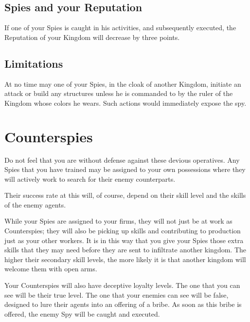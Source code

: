\subsection{Spies and your Reputation}

If one of your Spies is caught in his activities, and subsequently executed, the Reputation of your Kingdom will decrease by three points.

\subsection{Limitations}

At no time may one of your Spies, in the cloak of another Kingdom, initiate an attack or build any structures unless he is commanded to by the ruler of the Kingdom whose colors he wears. Such actions would immediately expose the spy.

\section{Counterspies}

Do not feel that you are without defense against these devious operatives. Any Spies that you have trained may be assigned to your own possessions where they will actively work to search for their enemy counterparts.

Their success rate at this will, of course, depend on their skill level and the skills of the enemy agents.

While your Spies are assigned to your firms, they will not just be at work as Counterspies; they will also be picking up skills and contributing to production just as your other workers. It is in this way that you give your Spies those extra skills that they may need before they are sent to infiltrate another kingdom. The higher their secondary skill levels, the more likely it is that another kingdom will welcome them with open arms.

Your Counterspies will also have deceptive loyalty levels. The one that you can see will be their true level. The one that your enemies can see will be false, designed to lure their agents into an offering of a bribe. As soon as this bribe is offered, the enemy Spy will be caught and executed.